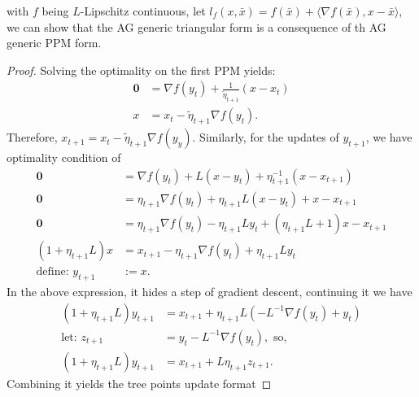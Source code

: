 \documentclass[12pt]{article}
\begin{document}
        \begin{proposition}\label{prop:tri_form_via_ppm}
            with $f$ being $L$-Lipschitz continuous, let $l_f(x, \bar x) = f(\bar x) + \langle \nabla f(\bar x), x - \bar x\rangle$, we can show that the AG generic triangular form is a consequence of th AG generic PPM form. 
        \end{proposition}
        \begin{proof}
            Solving the optimality on the first PPM yields: 
            \begin{align*}
                \mathbf 0 &= \nabla f(y_t) + 
                \frac{1}{\tilde \eta_{t + 1}} (x - x_t)
                \\
                x &= x_t - \tilde \eta_{t + 1} \nabla f(y_t).
            \end{align*}
            Therefore, $x_{t + 1} = x_t - \tilde \eta_{t + 1}\nabla f(y_y)$. 
            Similarly, for the updates of $y_{t + 1}$, we have optimality condition of 
            \begin{align*}
                \mathbf 0 &= \nabla f (y_t) + L (x - y_t) + \eta_{t + 1}^{-1} (x - x_{t + 1})
                \\
                \mathbf 0 &= \eta_{t + 1}\nabla f (y_t) + \eta_{t + 1}L (x - y_t) + x - x_{t + 1}
                \\
                \mathbf 0 &= 
                \eta_{t + 1}\nabla f(y_t) -\eta_{t + 1} Ly_t + (\eta_{t + 1}L + 1)x - x_{t + 1}
                \\
                (1 + \eta_{t + 1}L)x
                &= 
                x_{t + 1} - \eta_{t + 1}\nabla f(y_t) + \eta_{t + 1}L y_t
                \\
                \text{define: } y_{t + 1} &:= x. 
            \end{align*}
            In the above expression, it hides a step of gradient descent, continuing it we have 
            \begin{align*}
                (1 + \eta_{t + 1}L)y_{t + 1} &= 
                x_{t + 1}  + \eta_{t + 1}L (-L^{-1}\nabla f(y_t) + y_t)
                \\
                \text{let: } z_{t + 1} &= y_t - L^{-1}\nabla f(y_t), \text{ so, }
                \\
                (1 + \eta_{t + 1}L)y_{t + 1} &= 
                x_{t + 1} + L\eta_{t + 1}z_{t + 1}. 
            \end{align*}
            Combining it yields the tree points update format 

\end{proof}
\end{document}
